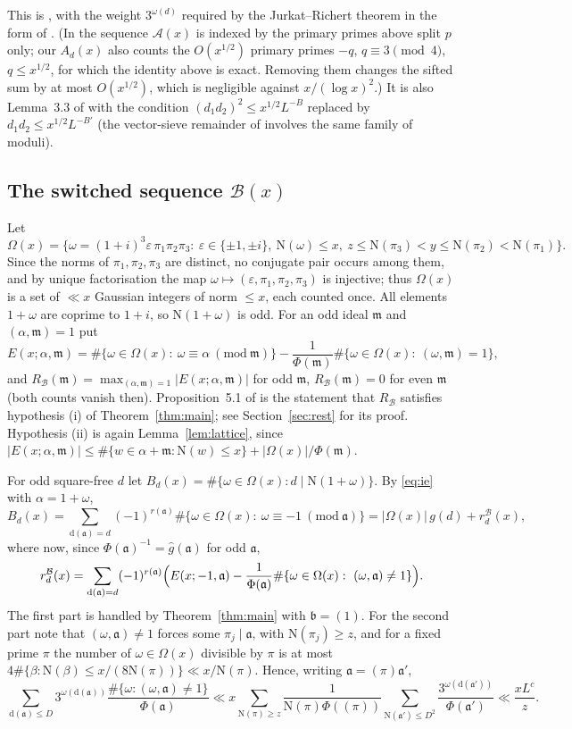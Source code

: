 \documentclass[11pt]{amsart}
\theoremstyle{remark}
\newcommand{\N}{\mathrm{N}}
\newcommand{\fa}{\mathfrak{a}}
\newcommand{\fb}{\mathfrak{b}}
\newcommand{\fm}{\mathfrak{m}}
\newcommand{\Om}{\Omega}
\newcommand{\dd}{\mathrm{d}}
\newcommand{\e}{\varepsilon}
\begin{document}
This is \cite[(3.9)]{IJU}, with the weight $3^{\omega(d)}$ required by the Jurkat--Richert theorem in the form of \cite[Theorem~8.4]{HR}. (In \cite{IJU} the sequence $\mathcal A(x)$ is indexed by the primary primes above split $p$ only; our $A_d(x)$ also counts the $O(x^{1/2})$ primary primes $-q$, $q\equiv3\pmod 4$, $q\le x^{1/2}$, for which the identity above is exact. Removing them changes the sifted sum by at most $O(x^{1/2})$, which is negligible against $x/(\log x)^2$.) It is also Lemma~3.3 of \cite{Xie} with the condition $(d_1d_2)^2\le x^{1/2}L^{-B}$ replaced by $d_1d_2\le x^{1/2}L^{-B'}$ (the vector-sieve remainder of \cite[Proposition~2.8]{Xie} involves the same family of moduli).

\subsection{The switched sequence $\mathcal B(x)$}
Let
\[
\Om(x)=\bigl\{\omega=(1+i)^3\e\,\pi_1\pi_2\pi_3:\ \e\in\{\pm1,\pm i\},\ \N(\omega)\le x,\ z\le\N(\pi_3)<y\le\N(\pi_2)<\N(\pi_1)\bigr\}.
\]
Since the norms of $\pi_1,\pi_2,\pi_3$ are distinct, no conjugate pair occurs among them, and by unique factorisation the map $\omega\mapsto(\e,\pi_1,\pi_2,\pi_3)$ is injective; thus $\Om(x)$ is a set of $\ll x$ Gaussian integers of norm $\le x$, each counted once. All elements $1+\omega$ are coprime to $1+i$, so $\N(1+\omega)$ is odd. For an odd ideal $\fm$ and $(\alpha,\fm)=1$ put
\[
E(x;\alpha,\fm)=\#\{\omega\in\Om(x):\ \omega\equiv\alpha\ (\mathrm{mod}\ \fm)\}-\frac{1}{\Phi(\fm)}\#\{\omega\in\Om(x):\ (\omega,\fm)=1\},
\]
and $R_{\mathcal B}(\fm)=\max_{(\alpha,\fm)=1}|E(x;\alpha,\fm)|$ for odd $\fm$, $R_{\mathcal B}(\fm)=0$ for even $\fm$ (both counts vanish then). Proposition~5.1 of \cite{IJU} is the statement that $R_{\mathcal B}$ satisfies hypothesis (i) of Theorem~\ref{thm:main}; see Section~\ref{sec:rest} for its proof. Hypothesis (ii) is again Lemma~\ref{lem:lattice}, since $|E(x;\alpha,\fm)|\le\#\{w\in\alpha+\fm:\N(w)\le x\}+|\Om(x)|/\Phi(\fm)$.

For odd square-free $d$ let $B_d(x)=\#\{\omega\in\Om(x): d\mid\N(1+\omega)\}$. By \eqref{eq:ie} with $\alpha=1+\omega$,
\[
B_d(x)=\sum_{\dd(\fa)=d}(-1)^{r(\fa)}\#\{\omega\in\Om(x):\ \omega\equiv-1\ (\mathrm{mod}\ \fa)\}
=|\Om(x)|\,g(d)+r^{\mathcal B}_d(x),
\]
where now, since $\Phi(\fa)^{-1}=\hat g(\fa)$ for odd $\fa$,
\[
r^{\mathcal B}_d(x)=\sum_{\dd(\fa)=d}(-1)^{r(\fa)}\Bigl(E(x;-1,\fa)-\frac{1}{\Phi(\fa)}\#\{\omega\in\Om(x):\ (\omega,\fa)\ne1\}\Bigr).
\]
The first part is handled by Theorem~\ref{thm:main} with $\fb=(1)$. For the second part note that $(\omega,\fa)\neq 1$ forces some $\pi_j\mid\fa$, with $\N(\pi_j)\ge z$, and for a fixed prime $\pi$ the number of $\omega\in\Om(x)$ divisible by $\pi$ is at most $4\#\{\beta:\N(\beta)\le x/(8\N(\pi))\}\ll x/\N(\pi)$. Hence, writing $\fa=(\pi)\fa'$,
\[
\sum_{\dd(\fa)\le D}3^{\omega(\dd(\fa))}\frac{\#\{\omega:(\omega,\fa)\ne1\}}{\Phi(\fa)}
\ll x\sum_{\N(\pi)\ge z}\frac{1}{\N(\pi)\Phi((\pi))}\sum_{\N(\fa')\le D^2}\frac{3^{\omega(\dd(\fa'))}}{\Phi(\fa')}\ll\frac{xL^{c}}{z}.
\]
\end{document}
